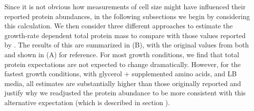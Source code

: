 \begin{figure}
\end{figure}

Since it is not obvious how measurements of cell size might have influenced
their reported protein abundances, in the following subsections we begin by
considering this calculation. We then consider three different approaches to
estimate the growth-rate dependent total protein mass to compare with those
values reported by \cite{schmidt_2016}. The results of this are summarized in
(B), with the original values from both
\cite{schmidt_2016} and \cite{li_2014} shown in (A)
for reference. For most growth conditions, we find that total protein
expectations are not expected to change dramatically. However, for the fastest
growth conditions, with glycerol + supplemented amino acids, and LB media, all
estimates are substantially higher than those originally reported and justify
why we readjusted the protein abundance to be more consistent with this
alternative expectation (which is described in section
).


